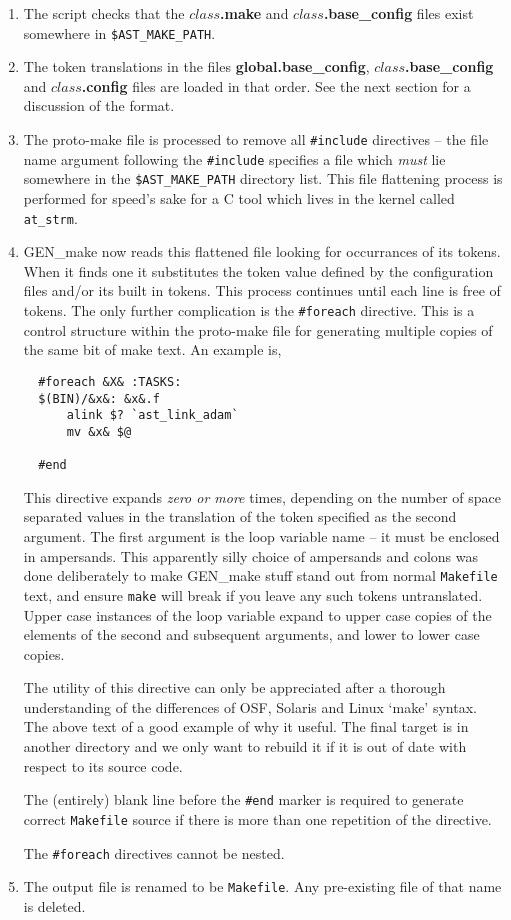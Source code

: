 \begin{enumerate}
\item The script checks that the {\bf $class$.make} and 
  {\bf $class$.base\_config} files
  exist somewhere in \verb+$AST_MAKE_PATH+.
  
\item The token translations in the files {\bf global.base\_config}, 
  {\bf $class$.base\_config} and
  {\bf $class$.config} files are loaded in that order. See the next
  section for a discussion of the format.
  
\item The proto-make file is processed to remove all \verb+#include+
  directives -- the file name argument following the \verb+#include+
  specifies a file which {\em must} lie somewhere in the \verb+$AST_MAKE_PATH+
  directory list. This file flattening process is performed for speed's
  sake for a C tool which lives in the kernel called \verb+at_strm+.

\item GEN\_make now reads this flattened file looking for occurrances of
  its tokens. When it finds one it substitutes the token value defined
  by the configuration files and/or its built in tokens. This process
  continues until each line is free of tokens. The only further
  complication is the \verb+#foreach+ directive. This is a control
  structure within the proto-make file for generating multiple copies
  of the same bit of make text. An example is,
  
  \begin{verbatim}
  #foreach &X& :TASKS:
  $(BIN)/&x&: &x&.f
      alink $? `ast_link_adam`
      mv &x& $@
	
  #end
  \end{verbatim}
  This directive  expands {\em zero or more} times, depending on the 
  number of space separated values in the translation of the token
  specified as the second argument. The first argument is the loop
  variable name -- it must be enclosed in ampersands. This apparently
  silly choice of ampersands and colons was done deliberately to make
  GEN\_make stuff stand out from normal \verb+Makefile+ text, and
  ensure \verb+make+ will break if you leave any such tokens untranslated. 
  Upper
  case instances of the loop variable expand to upper case copies of
  the elements of the second and subsequent arguments, and lower to 
  lower case copies.
  
  The utility of this directive can only be appreciated after a thorough
  understanding of the differences of OSF, Solaris and Linux `make'
  syntax. The above text of a good example of why it useful. The final
  target is in another directory and we only want to rebuild it if it
  is out of date with respect to its source code.

  The (entirely) blank line before the \verb+#end+ marker is required
  to generate correct \verb+Makefile+ source if there is more than one
  repetition of the directive.
  
  The \verb+#foreach+ directives cannot be nested.
  
\item The output file is renamed to be \verb+Makefile+. Any pre-existing
  file of that name is deleted.
\end{enumerate}


